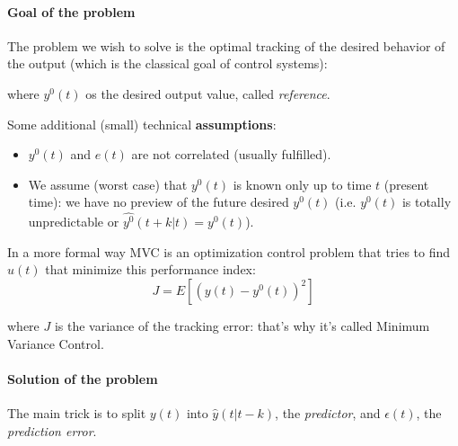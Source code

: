 \paragraph{Goal of the problem} 
The problem we wish to solve is the optimal tracking of the desired behavior of the output (which is the classical goal of control systems):
\begin{figure}[H]
    \centering
\end{figure}
where $y^0(t)$ os the desired output value, called \emph{reference}.

Some additional (small) technical \textbf{assumptions}:
\begin{itemize}
    \item $y^0(t)$ and $e(t)$ are not correlated (usually fulfilled).
    \item We assume (worst case) that $y^0(t)$ is known only up to time $t$ (present time): we have no preview of the future desired $y^0(t)$ (i.e. $y^0(t)$ is totally unpredictable or $\hat{y^0}(t+k|t) = y^0(t)$).
\end{itemize} 

In a more formal way MVC is an optimization control problem that tries to find $u(t)$ that minimize this performance index:
\[
    J = E\left[ (y(t) - y^0(t))^2 \right]
\]

where $J$ is the variance of the tracking error: that's why it's called Minimum Variance Control.

\paragraph{Solution of the problem}
The main trick is to split $y(t)$ into $\hat{y}(t|t-k)$, the \emph{predictor}, and $\epsilon(t)$, the \emph{prediction error}.

